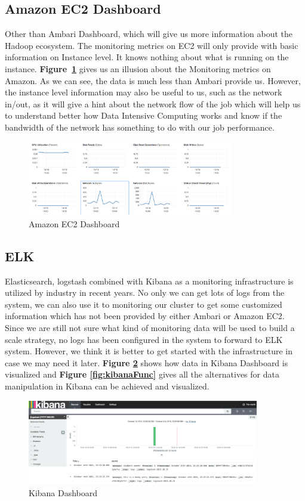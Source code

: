 \documentclass{article}
\begin{document}
 \subsection{Amazon EC2 Dashboard}
 Other than Ambari Dashboard, which will give us more information about the Hadoop ecosystem. The monitoring metrics on EC2 will only provide with basic information on Instance level. It knows nothing about what is running on the instance. \textbf{Figure~\ref{fig:aws}} gives us an illusion about the Monitoring metrics on Amazon. As we can see, the data is much less than Ambari provide us. However, the instance level information may also be useful to us, such as the network in/out, as it will give a hint about the network flow of the job which will help us to understand better how Data Intensive Computing works and know if the bandwidth of the network has something to do with our job performance.
\begin{figure}[ht!]
 \centering
  \includegraphics[width=0.8\textwidth,natwidth=1100,natheight=400]{fig4_3.png}
 \caption{Amazon EC2 Dashboard}
 \label{fig:aws}
 \end{figure}

 \subsection{ELK}
 Elasticsearch, logstash combined with Kibana as a monitoring infrastructure is utilized by industry in recent years. No only we can get lots of logs from the system, we can also use it to monitoring our cluster to get some customized information which has not been provided by either Ambari or Amazon EC2. Since we are still not sure what kind of monitoring data will be used to build a scale strategy, no logs has been configured in the system to forward to ELK system. However, we think it is better to get started with the infrastructure in case we may need it later. \textbf{Figure \ref{fig:kibana}} shows how data in Kibana Dashboard is visualized and \textbf{Figure \ref{fig:kibanaFunc}} gives all the alternatives for data manipulation in Kibana can be achieved and visualized.
\begin{figure}[ht!]
 \centering
  \includegraphics[width=0.9\textwidth,natwidth=1400,natheight=600]{fig4_4.png}
 \caption{Kibana Dashboard}
 \label{fig:kibana}
 \end{figure}
 
\end{document}
